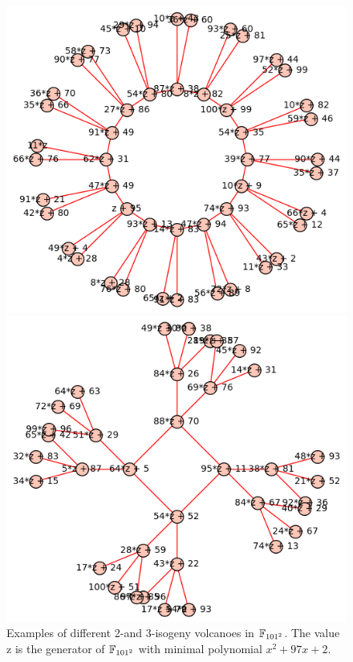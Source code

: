 \begin{figure}
\begin{minipage}{0.5\textwidth}
    \end{minipage}
    \begin{minipage}{0.5\textwidth}
        \includegraphics[width = \textwidth]{../example_II.png}
    \end{minipage}%
    \begin{minipage}{0.5\textwidth}
        \includegraphics[width = \textwidth]{../example_III.png}
    \end{minipage}
    \caption{
        \label{fig:example_vulcanos} Examples of different 2-and 3-isogeny volcanoes in $\mathbb{F}_{101^2}$. 
        The value $\mathrm{z}$ is the generator of $\mathbb{F}_{101^2}$ with minimal polynomial $x^2 + 97x + 2$.
    }
\end{figure}
